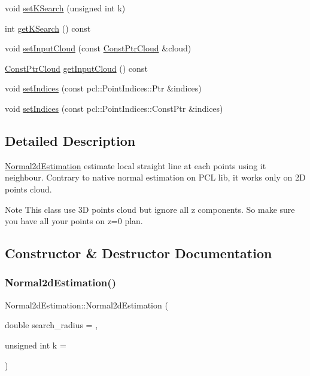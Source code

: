 \begin{DoxyCompactItemize}
void \hyperlink{classNormal2dEstimation_a7d0bd5709580b6533a0e3f84d4a4b0e6}{set\+K\+Search} (unsigned int k)
\item 
int \hyperlink{classNormal2dEstimation_a19ddcf3ade201742d36e64869c344641}{get\+K\+Search} () const
\item 
void \hyperlink{classNormal2dEstimation_a8cd86c1bddf1eb5bc7cb11f0a12810f8}{set\+Input\+Cloud} (const \hyperlink{Normal2dEstimation_8h_a389a43addc496dc19a5bb0575cc60bc4}{Const\+Ptr\+Cloud} \&cloud)
\item 
\hyperlink{Normal2dEstimation_8h_a389a43addc496dc19a5bb0575cc60bc4}{Const\+Ptr\+Cloud} \hyperlink{classNormal2dEstimation_a386f045fac5df50ed493d7b0aa265482}{get\+Input\+Cloud} () const
\item 
void \hyperlink{classNormal2dEstimation_a91bb44f43f09aa33f3c447cfe2cde6b3}{set\+Indices} (const pcl\+::\+Point\+Indices\+::\+Ptr \&indices)
\item 
void \hyperlink{classNormal2dEstimation_a57a561d5d51d42584687dd4a3d29defd}{set\+Indices} (const pcl\+::\+Point\+Indices\+::\+Const\+Ptr \&indices)
\end{DoxyCompactItemize}


\subsection{Detailed Description}
\hyperlink{classNormal2dEstimation}{Normal2d\+Estimation} estimate local straight line at each points using it neighbour. Contrary to native normal estimation on P\+CL lib, it works only on 2D points cloud. 

\begin{DoxyNote}{Note}
This class use 3D points cloud but ignore all z components. So make sure you have all your points on z=0 plan. 
\end{DoxyNote}


\subsection{Constructor \& Destructor Documentation}
\mbox{\label{classNormal2dEstimation_ac93035a8de2a45651571f7f6022f18b7}} 
\subsubsection{\texorpdfstring{Normal2d\+Estimation()}{Normal2dEstimation()}\hspace{0.1cm}{\footnotesize\ttfamily [1/2]}}
{\footnotesize\ttfamily Normal2d\+Estimation\+::\+Normal2d\+Estimation (\begin{DoxyParamCaption}\item[{double}]{search\+\_\+radius = {},  }\item[{unsigned int}]{k = {} }\end{DoxyParamCaption})\hspace{0.3cm}{\ttfamily [inline]}}



